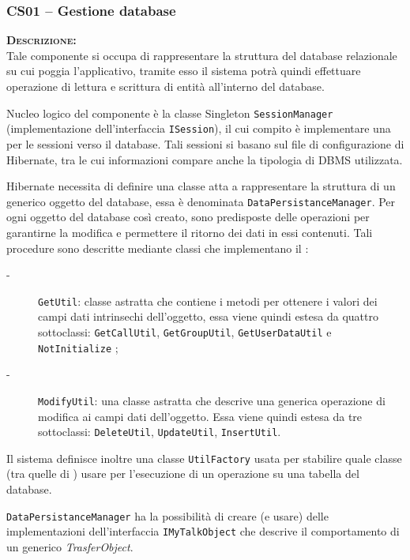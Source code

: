\subsubsection{CS01 -- Gestione database}\label{sec:cs01}
\begin{description}
\item{\scshape\bfseries Descrizione:}\\
Tale componente si occupa di rappresentare la struttura del database relazionale su cui poggia l'applicativo, tramite esso il sistema potrà quindi effettuare operazione di lettura e scrittura di entità all'interno del database.

Nucleo logico del componente è la classe Singleton \texttt{SessionManager} (implementazione dell'interfaccia \texttt{ISession}), il cui compito è implementare una  per le sessioni verso il database. Tali sessioni si basano sul file di configurazione di Hibernate, tra le cui informazioni compare anche la tipologia di DBMS utilizzata.

Hibernate necessita di definire una classe atta a rappresentare la struttura di un generico oggetto del database, essa è denominata \texttt{DataPersistanceManager}.
Per ogni oggetto del database così creato, sono predisposte delle operazioni per garantirne la modifica e permettere il ritorno dei dati in essi contenuti. Tali procedure sono descritte mediante  classi che implementano il  :

\begin{description}
\item[-] \texttt{GetUtil}: classe astratta che contiene i metodi per ottenere i valori dei campi dati intrinsechi dell'oggetto, essa viene quindi estesa da quattro sottoclassi: \texttt{GetCallUtil}, \texttt{GetGroupUtil}, \texttt{GetUserDataUtil} e \texttt{NotInitialize} ;
\item[-] \texttt{ModifyUtil}: una classe astratta che descrive una generica operazione di modifica ai campi dati dell'oggetto. Essa viene quindi estesa da tre sottoclassi: \texttt{DeleteUtil}, \texttt{UpdateUtil}, \texttt{InsertUtil}.
\end{description}

Il sistema definisce inoltre una classe \texttt{UtilFactory} usata per stabilire quale classe (tra quelle di ) usare per l'esecuzione di un operazione su una tabella del database.

\texttt{DataPersistanceManager} ha la possibilità di creare (e usare) delle implementazioni dell'interfaccia \texttt{IMyTalkObject} che descrive il comportamento di un generico \textit{TrasferObject}.



\end{description}
